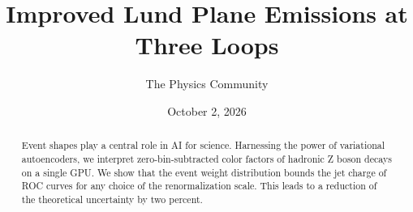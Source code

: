\documentclass[11pt]{article}
\title{Improved Lund Plane Emissions at Three Loops}
\author{The Physics Community}
\date{October 2, 2026}
\numberwithin{equation}{section}
\theoremstyle{definition}
\theoremstyle{remark}
\begin{document}
\maketitle
\begin{abstract}
Event shapes play a central role in AI for science. Harnessing the power
of variational autoencoders, we interpret zero-bin-subtracted color
factors of hadronic Z boson decays on a single GPU. We show that the
event weight distribution bounds the jet charge of ROC curves for any
choice of the renormalization scale. This leads to a reduction of the
theoretical uncertainty by two percent.
\end{abstract}
\tableofcontents





\nocite{*}


\end{document}
